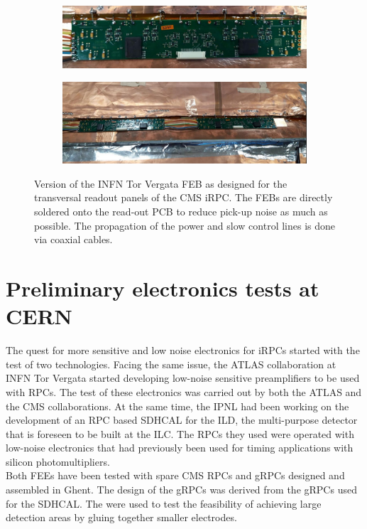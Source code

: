 	\begin{figure}[H]
		\begin{subfigure}{\linewidth}
		    \centering
			\includegraphics[width = .75\linewidth]{fig/chapt6/INFN-FEB-Transverse.png}
			\caption{\label{fig:INFN_FEB_Trans:A}}
		\end{subfigure}
		\begin{subfigure}{\linewidth}
		    \centering
			\includegraphics[width = .75\linewidth]{fig/chapt6/INFN-FEB-Transverse-on-readout.png}
			\caption{\label{fig:INFN_FEB_Trans:B}}
		\end{subfigure}
		\caption{\label{fig:INFN_FEB_Trans} Version of the INFN Tor Vergata FEB as designed for the transversal readout panels of the CMS iRPC. The FEBs are directly soldered onto the read-out PCB to reduce pick-up noise as much as possible. The propagation of the power and slow control lines is done via coaxial cables.}
    \end{figure}

\section{Preliminary electronics tests at CERN}
\label{chapt6:sec:Preliminary}

	The quest for more sensitive and low noise electronics for iRPCs started with the test of two technologies. Facing the same issue, the ATLAS collaboration at INFN Tor Vergata started developing low-noise sensitive preamplifiers to be used with RPCs. The test of these electronics was carried out by both the ATLAS and the CMS collaborations. At the same time, the \acf{IPNL} had been working on the development of an RPC based \acl{SDHCAL} for the ILD, the multi-purpose detector that is foreseen to be built at the \acf{ILC}. The RPCs they used were operated with low-noise electronics that had previously been used for timing applications with silicon photomultipliers.\\
	Both FEEs have been tested with spare CMS RPCs and \acl{gRPCs} designed and assembled in Ghent. The design of the gRPCs was derived from the gRPCs used for the SDHCAL. The were used to test the feasibility of achieving large detection areas by gluing together smaller electrodes.

